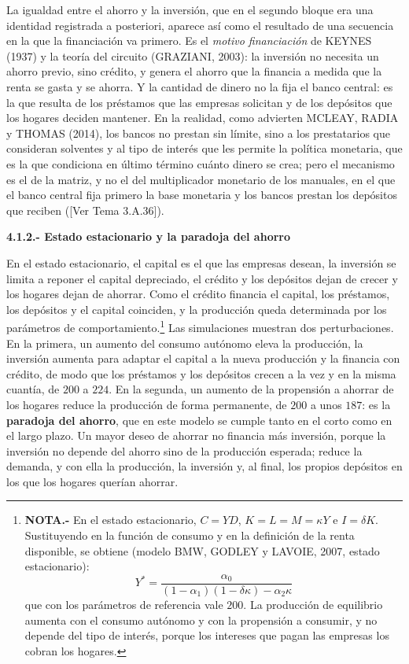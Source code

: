 \documentclass[10pt,a4paper]{article}
\newcommand{\authorfont}[1]{{\fontfamily{EBGaramond-TLF}\selectfont #1}}
\begin{document}
La igualdad entre el ahorro y la inversión, que en el segundo bloque era una identidad registrada a posteriori, aparece así como el resultado de una secuencia en la que la financiación va primero. Es el \textit{motivo financiación} de KEYNES (1937) y la teoría del circuito (GRAZIANI, 2003): la inversión no necesita un ahorro previo, sino crédito, y genera el ahorro que la financia a medida que la renta se gasta y se ahorra. Y la cantidad de dinero no la fija el banco central: es la que resulta de los préstamos que las empresas solicitan y de los depósitos que los hogares deciden mantener. En la realidad, como advierten MCLEAY, RADIA y THOMAS (2014), los bancos no prestan sin límite, sino a los prestatarios que consideran solventes y al tipo de interés que les permite la política monetaria, que es la que condiciona en último término cuánto dinero se crea; pero el mecanismo es el de la matriz, y no el del multiplicador monetario de los manuales, en el que el banco central fija primero la base monetaria y los bancos prestan los depósitos que reciben ([\authorfont{Ver Tema 3.A.36}]).

\textbf{4.1.2.- Estado estacionario y la paradoja del ahorro}

En el estado estacionario, el capital es el que las empresas desean, la inversión se limita a reponer el capital depreciado, el crédito y los depósitos dejan de crecer y los hogares dejan de ahorrar. Como el crédito financia el capital, los préstamos, los depósitos y el capital coinciden, y la producción queda determinada por los parámetros de comportamiento.\footnote{%
    \textbf{NOTA.-} En el estado estacionario, $C=YD$, $K=L=M=\kappa Y$ e $I=\delta K$. Sustituyendo en la función de consumo y en la definición de la renta disponible, se obtiene (modelo BMW, GODLEY y LAVOIE, 2007, estado estacionario):
    $$Y^{*}=\frac{\alpha_0}{(1-\alpha_1)(1-\delta\kappa)-\alpha_2\kappa}$$
    que con los parámetros de referencia vale $200$. La producción de equilibrio aumenta con el consumo autónomo y con la propensión a consumir, y no depende del tipo de interés, porque los intereses que pagan las empresas los cobran los hogares.
} Las simulaciones muestran dos perturbaciones. En la primera, un aumento del consumo autónomo eleva la producción, la inversión aumenta para adaptar el capital a la nueva producción y la financia con crédito, de modo que los préstamos y los depósitos crecen a la vez y en la misma cuantía, de $200$ a $224$. En la segunda, un aumento de la propensión a ahorrar de los hogares reduce la producción de forma permanente, de $200$ a unos $187$: es la \textbf{paradoja del ahorro}, que en este modelo se cumple tanto en el corto como en el largo plazo. Un mayor deseo de ahorrar no financia más inversión, porque la inversión no depende del ahorro sino de la producción esperada; reduce la demanda, y con ella la producción, la inversión y, al final, los propios depósitos en los que los hogares querían ahorrar.
\end{document}

